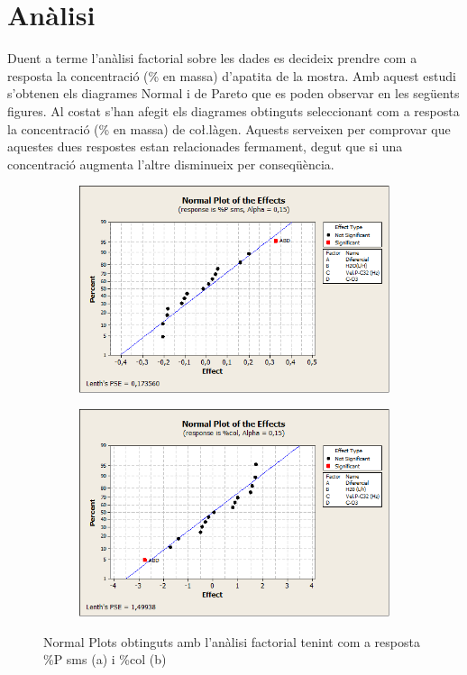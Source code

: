 \documentclass[a4paper]{article}
\begin{document}
\newpage

\section{Anàlisi}
Duent a terme l’anàlisi factorial sobre les dades es decideix prendre com a resposta la concentració (\% en massa) d’apatita de la mostra. Amb aquest estudi s’obtenen els diagrames Normal i de Pareto que es poden observar en les següents figures. Al costat s’han afegit els diagrames obtinguts seleccionant com a resposta la concentració (\% en massa) de co\l.làgen. Aquests serveixen per comprovar que aquestes dues respostes estan relacionades fermament, degut que si una concentració augmenta l’altre disminueix per conseqüència.
\begin{figure}[H]
	\begin{subfigure}{.5\textwidth}
		\centering
		\includegraphics[width=.9\linewidth]{images/NormalEffects15P}
		\caption{}
		\label{fig:NormalEffects15P}
	\end{subfigure}%
	\begin{subfigure}{.5\textwidth}
		\centering
		\includegraphics[width=.9\linewidth]{images/NormalEffects15col}
		\caption{}
		\label{fig:NormalEffects15C}
	\end{subfigure}
	\caption{Normal Plots obtinguts amb l’anàlisi factorial tenint com a resposta \%P sms (a) i \%col (b)}
	\label{fig:NormalEffects15}
\end{figure}
\end{document}

